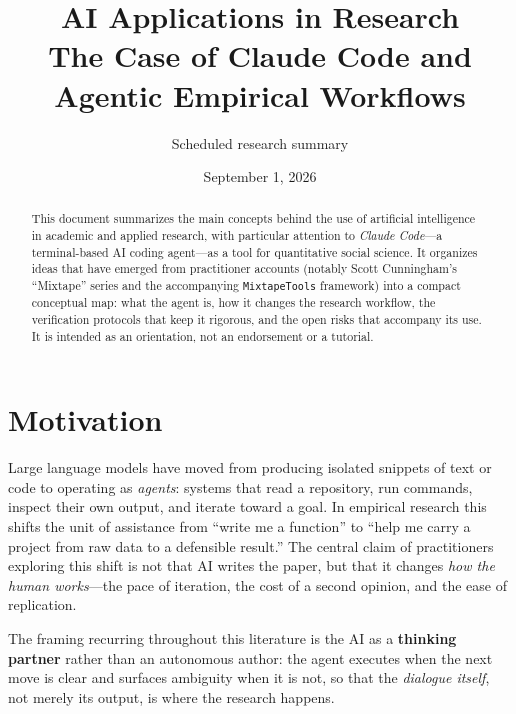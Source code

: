 \documentclass[11pt]{article}
\title{\textbf{AI Applications in Research}\\[0.3em]
\large The Case of Claude Code and Agentic Empirical Workflows}
\author{Scheduled research summary}
\date{September 1, 2026}
\begin{document}
\maketitle

\begin{abstract}
\noindent This document summarizes the main concepts behind the use of
artificial intelligence in academic and applied research, with particular
attention to \emph{Claude Code}---a terminal-based AI coding agent---as a tool
for quantitative social science. It organizes ideas that have emerged from
practitioner accounts (notably Scott Cunningham's ``Mixtape'' series and the
accompanying \texttt{MixtapeTools} framework) into a compact conceptual map:
what the agent is, how it changes the research workflow, the verification
protocols that keep it rigorous, and the open risks that accompany its use.
It is intended as an orientation, not an endorsement or a tutorial.
\end{abstract}

\tableofcontents
\vspace{1em}

\section{Motivation}
Large language models have moved from producing isolated snippets of text or
code to operating as \emph{agents}: systems that read a repository, run
commands, inspect their own output, and iterate toward a goal. In empirical
research this shifts the unit of assistance from ``write me a function'' to
``help me carry a project from raw data to a defensible result.'' The central
claim of practitioners exploring this shift is not that AI writes the paper,
but that it changes \emph{how the human works}---the pace of iteration, the
cost of a second opinion, and the ease of replication.

The framing recurring throughout this literature is the AI as a
\textbf{thinking partner} rather than an autonomous author: the agent executes
when the next move is clear and surfaces ambiguity when it is not, so that the
\emph{dialogue itself}, not merely its output, is where the research happens.

\end{document}
